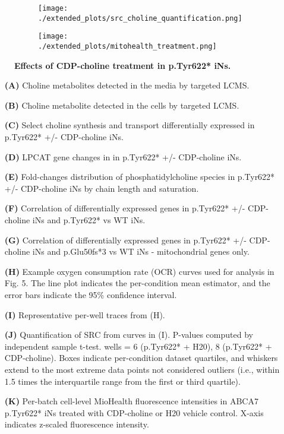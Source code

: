 \begin{figure}[H]
\begin{subfigure}[t]{.25\textwidth}
    \end{subfigure}
    \begin{subfigure}[t]{.2\textwidth}
        \caption{}
        \texttt{[image: ./extended\_plots/src\_choline\_quantification.png]}        
    \end{subfigure}
    \begin{subfigure}[t]{.2\textwidth}
        \caption{}
        \texttt{[image: ./extended\_plots/mitohealth\_treatment.png]}        
    \end{subfigure}
    \caption{
         \textbf{Effects of CDP-choline treatment in p.Tyr622* iNs.}\\
     }
     \label{fig:choline_treatment}
\end{figure}
\begin{itemize}
    \item[\textbf{(A)}] Choline metabolites detected in the media by targeted LCMS.
    \item[\textbf{(B)}] Choline metabolite detected in the cells by targeted LCMS.
    \item[\textbf{(C)}] Select choline synthesis and transport differentially expressed in p.Tyr622* +/- CDP-choline iNs.
    \item[\textbf{(D)}] LPCAT gene changes in in p.Tyr622* +/- CDP-choline iNs.
    \item[\textbf{(E)}] Fold-changes distribution of phosphatidylcholine species in p.Tyr622* +/- CDP-choline iNs by chain length and saturation.
    \item[\textbf{(F)}] Correlation of differentially expressed genes in p.Tyr622* +/- CDP-choline iNs and p.Tyr622* vs WT iNs.
    \item[\textbf{(G)}] Correlation of differentially expressed genes in p.Tyr622* +/- CDP-choline iNs and p.Glu50fs*3 vs WT iNs - mitochondrial genes only.
    \item[\textbf{(H)}] Example oxygen consumption rate (OCR) curves used for analysis in Fig. 5. The line plot indicates the per-condition mean estimator, and the error bars indicate the 95\% confidence interval. 
    \item[\textbf{(I)}] Representative per-well traces from (H).
    \item[\textbf{(J)}] Quantification of SRC from curves in (I). P-values computed by independent sample t-test.  wells = 6 (p.Tyr622* + H20), 8 (p.Tyr622* + CDP-choline). Boxes indicate per-condition dataset quartiles, and whiskers extend to the most extreme data points not considered outliers (i.e., within 1.5 times the interquartile range from the first or third quartile). 
    \item[\textbf{(K)}] Per-batch cell-level MioHealth fluorescence intensities in ABCA7 p.Tyr622* iNs treated with CDP-choline or H20 vehicle control. X-axis indicates z-scaled fluorescence intensity.
\end{itemize}